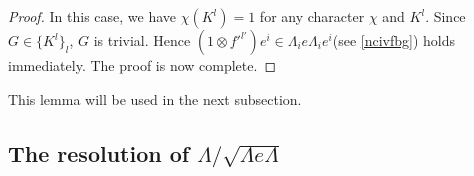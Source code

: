 \documentclass[11pt,reqno]{amsart}
\theoremstyle{definition}
\begin{document}
\begin{proof}
In this case, we have $\chi(K^l) = 1$ for any character $\chi$ and $K^l$. Since $G \in \{K^l\}_l$, $G$ is trivial. Hence 
$(1 \otimes f'^{l'})e^i \in \Lambda_i e \Lambda_i e^{i}$(see \ref{ncivfbg}) holds immediately. 
The proof is now complete. 
%
%
%
\end{proof}

This lemma will be used
in the next subsection.

\subsection{The resolution of $\Lambda/ \sqrt{\Lambda e\Lambda}$}
\end{document}
